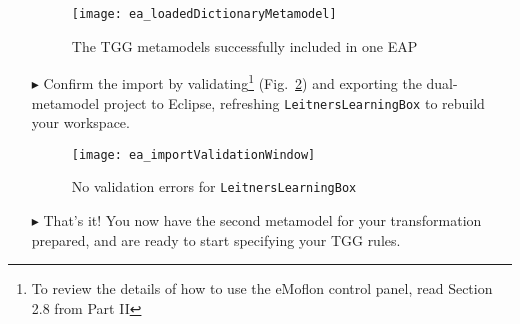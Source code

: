 \begin{itemize}
\begin{figure}[htbp]
\begin{center}
  \texttt{[image: ea\_loadedDictionaryMetamodel]}
  \caption{The TGG metamodels successfully included in one EAP}
  \label{ea:importProBrowser}
\end{center}
\end{figure}

\clearpage

\item[$\blacktriangleright$] Confirm the import by validating\footnote{To review the details of how to use the eMoflon control panel, read Section 2.8 from
Part II} (Fig.~\ref{ea:importValidationWindow}) and exporting the dual-metamodel project to Eclipse, refreshing \texttt{LeitnersLearningBox} to rebuild your workspace. 

\vspace{0.5cm}

\begin{figure}[htbp]
\begin{center}
  \texttt{[image: ea\_importValidationWindow]}
  \caption{No validation errors for \texttt{LeitnersLearningBox}}
  \label{ea:importValidationWindow}
\end{center}
\end{figure}

\vspace{0.5cm}

\item[$\blacktriangleright$] That's it! You now have the second metamodel for your transformation prepared, and are ready to start specifying your TGG rules.


\end{itemize}
